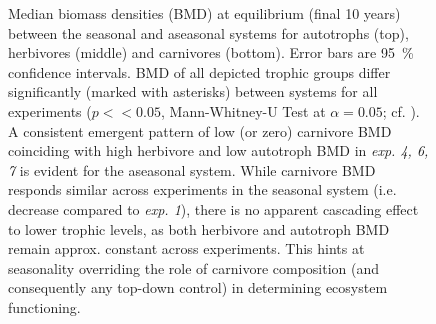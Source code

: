 \begin{figure}
\centering

\caption[Comparison median biomass density (BMD) for aseasonal and seasonal ecosystems]{Median biomass densities (BMD) at equilibrium (final 10 years) between the seasonal and aseasonal systems for autotrophs (top), herbivores (middle) and carnivores (bottom). Error bars are 95~\% confidence intervals. BMD of all depicted trophic groups differ significantly (marked with asterisks) between systems for all experiments ($p << 0.05$, Mann-Whitney-U Test at $\alpha = 0.05$; cf. ).%
 A consistent emergent pattern of low (or zero) carnivore BMD coinciding with high herbivore and low autotroph BMD in \textit{exp. 4, 6, 7} is evident for the aseasonal system.
  While carnivore BMD responds similar across experiments in the seasonal system (i.e. decrease compared to \textit{exp. 1}), there is no apparent cascading effect to lower trophic levels, as both herbivore and autotroph BMD remain approx. constant across experiments.
  This hints at seasonality overriding the role of carnivore composition (and consequently any top-down control) in determining ecosystem functioning.}
\label{fig:chap:res:dyn:c0}
\end{figure}




